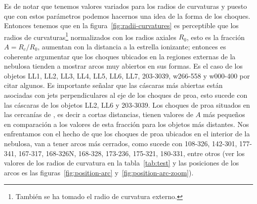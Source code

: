 Es de notar que tenemos valores variados para los radios de curvaturas y puesto que con estos parámetros podemos hacernos una idea de la forma de los choques. Entonces tenemos que en la figura~\ref{fig:radii-curvatures} es perceptible que los radios de curvaturas\footnote{También se ha tomado el radio de curvatura externo.} normalizados con los radios axiales \(R_{0}\), esto es la fracción \(A=R_{c}/R_{0}\), aumentan con la distancia a la estrella ionizante; entonces es coherente argumentar que los choques ubicados en la regiones externas de la nebulosa tienden a mostrar arcos muy abiertos en sus formas. Es el caso de los objetos LL1, LL2, LL3, LL4, LL5, LL6, LL7,  203-3039, w266-558 y w000-400 por citar algunos. Es importante señalar que las cáscaras más abiertas están asociadas con jets perpendiculares al eje de los choques de proa, esto sucede con las cáscaras de los objetos LL2, LL6 y 203-3039. Los choques de proa situados en las cercanías de \thC{}, es decir a cortas distancias, tienen valores de \(A\) más pequeños en comparación a los valores de esta fracción para los objetos más distantes. Nos enfrentamos con el hecho de que los choques de proa ubicados en el interior de la nebulosa, van a tener arcos más cerrados, como sucede con 108-326, 142-301, 177-341, 167-317, 168-326N, 168-328, 173-236, 175-321, 180-331, entre otros (ver los valores de los radios de curvatura en la tabla~\ref{tab:test}  y las posiciones de los arcos es las figuras~\ref{fig:position-arc} y~\ref{fig:position-arc-zoom}).\\  

